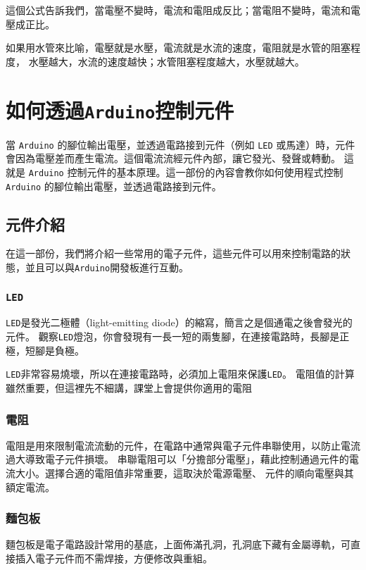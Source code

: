 \documentclass[12pt,a4paper]{article}
\begin{document}
這個公式告訴我們，當電壓不變時，電流和電阻成反比；當電阻不變時，電流和電壓成正比。

如果用水管來比喻，電壓就是水壓，電流就是水流的速度，電阻就是水管的阻塞程度，
水壓越大，水流的速度越快；水管阻塞程度越大，水壓就越大。

\section{如何透過\texttt{Arduino}控制元件}

當 \texttt{Arduino} 的腳位輸出電壓，並透過電路接到元件（例如 \texttt{LED} 或馬達）時，元件會因為電壓差而產生電流。這個電流流經元件內部，讓它發光、發聲或轉動。
這就是 \texttt{Arduino} 控制元件的基本原理。這一部份的內容會教你如何使用程式控制 \texttt{Arduino} 的腳位輸出電壓，並透過電路接到元件。

\subsection{元件介紹}
在這一部份，我們將介紹一些常用的電子元件，這些元件可以用來控制電路的狀態，並且可以與\texttt{Arduino}開發板進行互動。

\subsubsection{\texttt{LED}}

\texttt{LED}是發光二極體（light-emitting diode）的縮寫，簡言之是個通電之後會發光的元件。
觀察\texttt{LED}燈泡，你會發現有一長一短的兩隻腳，在連接電路時，長腳是正極，短腳是負極。

\texttt{LED}非常容易燒壞，所以在連接電路時，必須加上電阻來保護\texttt{LED}。
電阻值的計算雖然重要，但這裡先不細講，課堂上會提供你適用的電阻

\subsubsection{電阻}
電阻是用來限制電流流動的元件，在電路中通常與電子元件串聯使用，以防止電流過大導致電子元件損壞。
串聯電阻可以「分擔部分電壓」，藉此控制通過元件的電流大小。選擇合適的電阻值非常重要，這取決於電源電壓、
元件的順向電壓與其額定電流。


\subsubsection{麵包板}

麵包板是電子電路設計常用的基底，上面佈滿孔洞，孔洞底下藏有金屬導軌，可直接插入電子元件而不需焊接，方便修改與重組。
\end{document}
